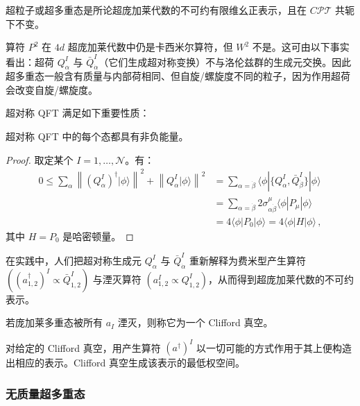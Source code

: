 \begin{definition}[17.3] 超粒子或超多重态是所论超庞加莱代数的不可约有限维幺正表示，且在 $C\mathcal{PT}$ 共轭下不变。\end{definition}

算符 $P^2$ 在 $4d$ 超庞加莱代数中仍是卡西米尔算符，但 $W^2$ 不是。这可由以下事实看出：超荷 $Q^I_\alpha$ 与 $\bar Q^I_{\dot\alpha}$（它们生成超对称变换）不与洛伦兹群的生成元交换。因此超多重态一般含有质量与内部荷相同、但自旋/螺旋度不同的粒子，因为作用超荷会改变自旋/螺旋度。

超对称 QFT 满足如下重要性质：

\begin{proposition}[17.4] 超对称 QFT 中的每个态都具有非负能量。\end{proposition}

\begin{proof} 取定某个 $I=1,\dots,\mathcal{N}$。有：
\begin{equation}
\begin{aligned}
0\le\sum_\alpha\left\|(Q^I_\alpha)^\dagger|\phi\rangle\right\|^2+\left\|Q^I_\alpha|\phi\rangle\right\|^2
&=\sum_{\alpha=\dot\beta}\langle\phi|\{Q^I_\alpha,\bar Q^I_{\dot\beta}\}|\phi\rangle\\
&=\sum_{\alpha=\dot\beta}2\sigma^\mu_{\alpha\dot\beta}\langle\phi|P_\mu|\phi\rangle\\
&=4\langle\phi|P_0|\phi\rangle=4\langle\phi|H|\phi\rangle\,,
\end{aligned}
\tag{17.2}
\end{equation}
其中 $H=P_0$ 是哈密顿量。
\end{proof}

在实践中，人们把超对称生成元 $Q^I_\alpha$ 与 $\bar Q^I_{\dot\alpha}$ 重新解释为费米型产生算符 $((a^\dagger_{1,2})^I\propto\bar Q^I_{1,2})$ 与湮灭算符 $(a^I_{1,2}\propto Q^I_{1,2})$，从而得到超庞加莱代数的不可约表示。

\begin{definition}[17.5] 若庞加莱多重态被所有 $a_I$ 湮灭，则称它为一个 Clifford 真空。\end{definition}

对给定的 Clifford 真空，用产生算符 $(a^\dagger)^I$ 以一切可能的方式作用于其上便构造出相应的表示。Clifford 真空生成该表示的最低权空间。

\subsubsection*{无质量超多重态}

